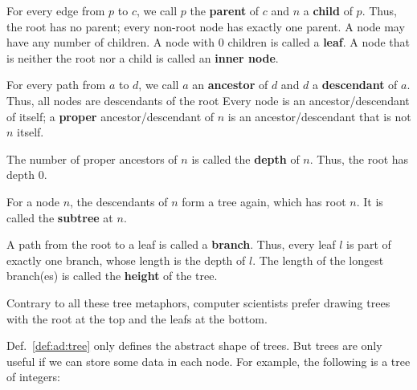 \begin{definition}\label{def:ad:treeaux}
For every edge from $p$ to $c$, we call $p$ the \textbf{parent} of $c$ and $n$ a \textbf{child} of $p$.
Thus, the root has no parent; every non-root node has exactly one parent.
A node may have any number of children.
A node with $0$ children is called a \textbf{leaf}.
A node that is neither the root nor a child is called an \textbf{inner node}.

For every path from $a$ to $d$, we call $a$ an \textbf{ancestor} of $d$ and $d$ a \textbf{descendant} of $a$.
Thus, all nodes are descendants of the root
Every node is an ancestor/descendant of itself; a \textbf{proper} ancestor/descendant of $n$ is an ancestor/descendant that is not $n$ itself.

The number of proper ancestors of $n$ is called the \textbf{depth} of $n$.
Thus, the root has depth $0$.

For a node $n$, the descendants of $n$ form a tree again, which has root $n$.
It is called the \textbf{subtree} at $n$.

A path from the root to a leaf is called a \textbf{branch}.
Thus, every leaf $l$ is part of exactly one branch, whose length is the depth of $l$.
The length of the longest branch(es) is called the \textbf{height} of the tree.
\end{definition}

\begin{remark}
Contrary to all these tree metaphors, computer scientists prefer drawing trees with the root at the top and the leafs at the bottom.
\end{remark}

Def.~\ref{def:ad:tree} only defines the abstract shape of trees.
But trees are only useful if we can store some data in each node.
For example, the following is a tree of integers:

\begin{center}
\end{center}


